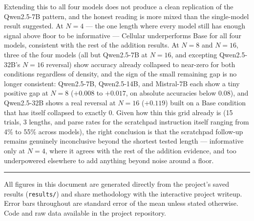 \documentclass[11pt]{article}
\begin{document}
Extending this to all four models does not produce a clean replication of the Qwen2.5-7B pattern, and the honest reading is more mixed than the single-model result suggested. At $N=4$ --- the one length where every model still has enough signal above floor to be informative --- Cellular underperforms Base for all four models, consistent with the rest of the addition results. At $N=8$ and $N=16$, three of the four models (all but Qwen2.5-7B at $N=16$, and excepting Qwen2.5-32B's $N=16$ reversal) show accuracy already collapsed to near-zero for both conditions regardless of density, and the sign of the small remaining gap is no longer consistent: Qwen2.5-7B, Qwen2.5-14B, and Mistral-7B each show a tiny positive gap at $N=8$ ($+0.008$ to $+0.017$, on absolute accuracies below 0.08), and Qwen2.5-32B shows a real reversal at $N=16$ ($+0.119$) built on a Base condition that has itself collapsed to exactly 0. Given how thin this grid already is (15 trials, 3 lengths, and parse rates for the scratchpad instruction itself ranging from 4\% to 55\% across models), the right conclusion is that the scratchpad follow-up remains genuinely inconclusive beyond the shortest tested length --- informative only at $N=4$, where it agrees with the rest of the addition evidence, and too underpowered elsewhere to add anything beyond noise around a floor.

\vfill
\noindent\rule{\textwidth}{0.4pt}

\noindent\small All figures in this document are generated directly from the project's saved results (\texttt{results/}) and share methodology with the interactive project writeup. Error bars throughout are standard error of the mean unless stated otherwise. Code and raw data available in the project repository.
\end{document}
